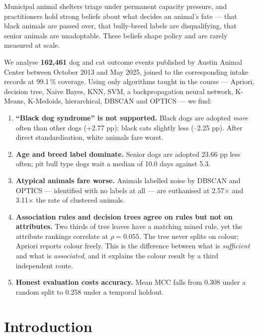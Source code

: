 \documentclass[11pt,a4paper]{article}
\begin{document}
Municipal animal shelters triage under permanent capacity pressure, and
practitioners hold strong beliefs about what decides an animal's fate --- that
black animals are passed over, that bully-breed labels are disqualifying, that
senior animals are unadoptable. These beliefs shape policy and are rarely
measured at scale.

We analyse \textbf{162{,}461} dog and cat outcome events published by Austin
Animal Center between October 2013 and May 2025, joined to the corresponding
intake records at 99.1\,\% coverage. Using only algorithms taught in the course
--- Apriori, decision tree, Naive Bayes, KNN, SVM, a backpropagation neural
network, K-Means, K-Medoids, hierarchical, DBSCAN and OPTICS --- we find:

\begin{enumerate}[label=(\roman*)]
  \item \textbf{``Black dog syndrome'' is not supported.} Black dogs are adopted
        \emph{more} often than other dogs (+2.77 pp); black cats slightly less
        (--2.25 pp). After direct standardisation, white animals fare worst.
  \item \textbf{Age and breed label dominate.} Senior dogs are adopted 23.66 pp
        less often; pit bull type dogs wait a median of 10.0 days against 5.3.
  \item \textbf{Atypical animals fare worse.} Animals labelled noise by DBSCAN
        and OPTICS --- identified with no labels at all --- are euthanised at
        2.57$\times$ and 3.11$\times$ the rate of clustered animals.
  \item \textbf{Association rules and decision trees agree on rules but not on
        attributes.} Two thirds of tree leaves have a matching mined rule, yet
        the attribute rankings correlate at $\rho = 0.055$. The tree never
        splits on colour; Apriori reports colour freely. This is the difference
        between what is \emph{sufficient} and what is \emph{associated}, and it
        explains the colour result by a third independent route.
  \item \textbf{Honest evaluation costs accuracy.} Mean MCC falls from 0.308
        under a random split to 0.258 under a temporal holdout.
\end{enumerate}

\section{Introduction}
\end{document}
